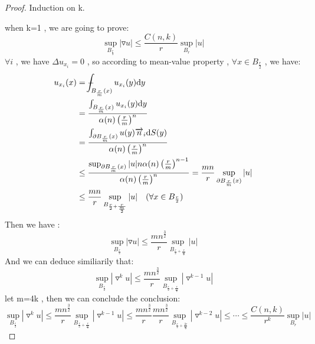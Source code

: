 \begin{proof}
    Induction on k.
    \par
    when k=1 , we are going to prove:
    \begin{equation*}
        \sup_{B_{\frac{r}{2}}}|\triangledown u|\leq \frac{C(n,k)}{r}\sup_{B_r}|u|
    \end{equation*}
    $\forall i$ , we have $\Delta u_{x_i}=0$ , so according to mean-value property , $\forall x \in B_{\frac{r}{2}}$ , we have:
    \begin{equation*}
        \begin{aligned}
        u_{x_i}(x)&=\dashint_{B_\frac{r}{m}(x)} u_{x_i}(y)\dd y\\
        &=\frac{\int_{B_{\frac{r}{m}}(x)}u_{x_i}(y)\dd y}
        {\alpha(n)\left(\frac{r}{m}\right)^n}\\
        &=\frac{\int_{\partial B_{\frac{r}{m}}(x)}u(y) \overrightarrow {n}_i \dd S(y)}
        {\alpha(n)\left(\frac{r}{m}\right)^n}\\
        &\leq \frac{\sup_{\partial B_{\frac{r}{m}}(x)}|u|n\alpha(n)\left(\frac{r}{m}\right)^{n-1}}
        {\alpha(n)\left(\frac{r}{m}\right)^n} =\frac{mn}{r}\sup_{\partial B_{\frac{r}{m}}(x)}|u| \\
        &\leq \frac{mn}{r} \sup_{B_{\frac{r}{2}+\frac{r}{\frac{m}{2}}}}|u| \quad(\forall x\in B_{\frac{r}{2}})
        \end{aligned}
    \end{equation*}
    Then we have :
    \begin{equation*}
        \sup_{B_{\frac{r}{2}}}|\triangledown u|\leq \frac{mn^{\frac{3}{2}}}{r}\sup_{B_{\frac{r}{2}+\frac{r}{\frac{m}{2}}}}|u| 
    \end{equation*}
    And we can deduce similiarily that:
    \begin{equation*}
        \sup_{B_{\frac{r}{2}}}|\triangledown^k u|\leq \frac{mn^{\frac{3}{2}}}{r}\sup_{B_{\frac{r}{2}+\frac{r}{\frac{m}{2}}}}|\triangledown^{k-1}u| 
    \end{equation*}
    let m=4k , then we can conclude the conclusion:
    \begin{equation*}
        \sup_{B_{\frac{r}{2}}}|\triangledown^k u|\leq \frac{mn^{\frac{3}{2}}}{r}\sup_{B_{\frac{r}{2}+\frac{r}{\frac{m}{2}}}}|\triangledown^{k-1}u| \leq \frac{mn^{\frac{3}{2}}}{r}\frac{mn^{\frac{3}{2}}}{r} \sup_{B_{\frac{r}{2}+\frac{2r}{\frac{m}{2}}}}|\triangledown^{k-2}u|\leq \cdots \leq \frac{C(n,k)}{r^k}\sup_{B_r}|u|
    \end{equation*}
\end{proof}


